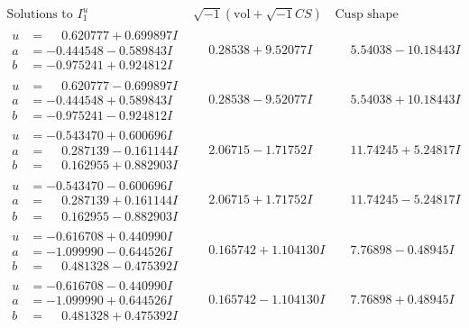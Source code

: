 \documentclass[1p]{elsarticle_modified}
\theoremstyle{definition}
\newcommand{\I}{\sqrt{-1}}
\begin{document}
$$\begin{array}{c|c|c}  
\text{Solutions to }I^u_{1}& \I (\text{vol} + \sqrt{-1}CS) & \text{Cusp shape}\\
 \hline 
\begin{aligned}
u &= \phantom{-}0.620777 + 0.699897 I \\
a &= -0.444548 - 0.589843 I \\
b &= -0.975241 + 0.924812 I\end{aligned}
 & \phantom{-}0.28538 + 9.52077 I & \phantom{-}5.54038 - 10.18443 I \\ \hline\begin{aligned}
u &= \phantom{-}0.620777 - 0.699897 I \\
a &= -0.444548 + 0.589843 I \\
b &= -0.975241 - 0.924812 I\end{aligned}
 & \phantom{-}0.28538 - 9.52077 I & \phantom{-}5.54038 + 10.18443 I \\ \hline\begin{aligned}
u &= -0.543470 + 0.600696 I \\
a &= \phantom{-}0.287139 - 0.161144 I \\
b &= \phantom{-}0.162955 + 0.882903 I\end{aligned}
 & \phantom{-}2.06715 - 1.71752 I & \phantom{-}11.74245 + 5.24817 I \\ \hline\begin{aligned}
u &= -0.543470 - 0.600696 I \\
a &= \phantom{-}0.287139 + 0.161144 I \\
b &= \phantom{-}0.162955 - 0.882903 I\end{aligned}
 & \phantom{-}2.06715 + 1.71752 I & \phantom{-}11.74245 - 5.24817 I \\ \hline\begin{aligned}
u &= -0.616708 + 0.440990 I \\
a &= -1.099990 - 0.644526 I \\
b &= \phantom{-}0.481328 - 0.475392 I\end{aligned}
 & \phantom{-}0.165742 + 1.104130 I & \phantom{-}7.76898 - 0.48945 I \\ \hline\begin{aligned}
u &= -0.616708 - 0.440990 I \\
a &= -1.099990 + 0.644526 I \\
b &= \phantom{-}0.481328 + 0.475392 I\end{aligned}
 & \phantom{-}0.165742 - 1.104130 I & \phantom{-}7.76898 + 0.48945 I \\ \hline\begin{aligned}

\end{aligned}
\end{array}$$
\end{document}
